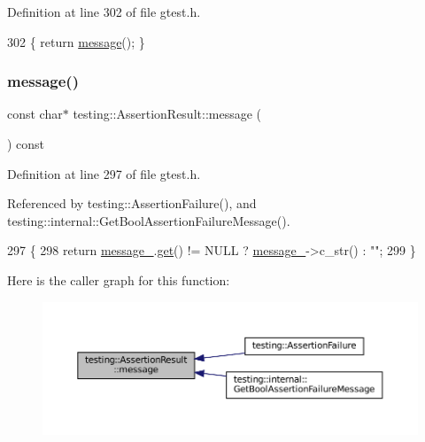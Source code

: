 Definition at line 302 of file gtest.\+h.


\begin{DoxyCode}
302 \{ \textcolor{keywordflow}{return} \hyperlink{classtesting_1_1AssertionResult_a33c14dafd28e3393c841e03f4b70a017}{message}(); \}
\end{DoxyCode}
\mbox{\label{classtesting_1_1AssertionResult_a33c14dafd28e3393c841e03f4b70a017}} 
\subsubsection{\texorpdfstring{message()}{message()}}
{\footnotesize\ttfamily const char$\ast$ testing\+::\+Assertion\+Result\+::message (\begin{DoxyParamCaption}{ }\end{DoxyParamCaption}) const\hspace{0.3cm}{\ttfamily [inline]}}



Definition at line 297 of file gtest.\+h.



Referenced by testing\+::\+Assertion\+Failure(), and testing\+::internal\+::\+Get\+Bool\+Assertion\+Failure\+Message().


\begin{DoxyCode}
297                               \{
298     \textcolor{keywordflow}{return} \hyperlink{classtesting_1_1AssertionResult_a5dee995939457def35f0bf496d070957}{message\_}.\hyperlink{classtesting_1_1internal_1_1scoped__ptr_aa5984291e12453f1e81b7676d1fa26fd}{get}() != NULL ?  \hyperlink{classtesting_1_1AssertionResult_a5dee995939457def35f0bf496d070957}{message\_}->c\_str() : \textcolor{stringliteral}{""};
299   \}
\end{DoxyCode}
Here is the caller graph for this function\+:
\nopagebreak
\begin{figure}[H]
\begin{center}
\leavevmode
\includegraphics[width=350pt]{classtesting_1_1AssertionResult_a33c14dafd28e3393c841e03f4b70a017_icgraph}
\end{center}
\end{figure}
\mbox{\label{classtesting_1_1AssertionResult_ab3f34b1623c82762ef4a8f52b535159c}} 
